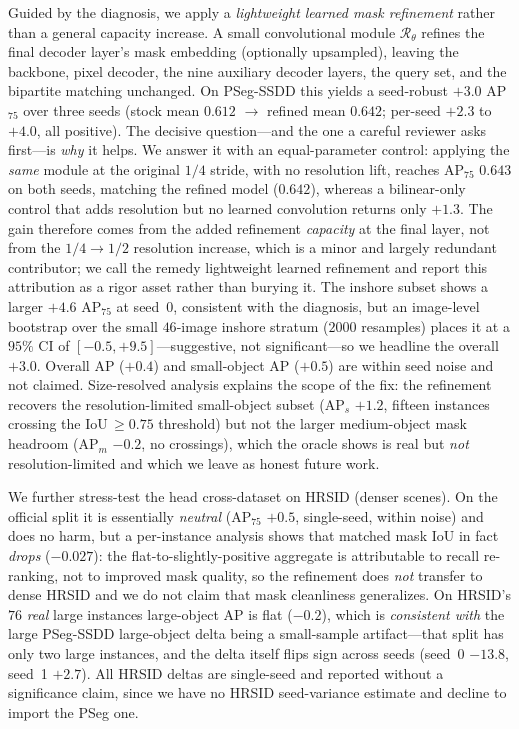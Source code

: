 Guided by the diagnosis, we apply a \emph{lightweight learned mask refinement} rather than a general capacity increase. A small convolutional module $\mathcal{R}_{\theta}$ refines the final decoder layer's mask embedding (optionally upsampled), leaving the backbone, pixel decoder, the nine auxiliary decoder layers, the query set, and the bipartite matching unchanged. On PSeg-SSDD this yields a seed-robust $+3.0$ AP$_{75}$ over three seeds (stock mean $0.612$ $\rightarrow$ refined mean $0.642$; per-seed $+2.3$ to $+4.0$, all positive). The decisive question---and the one a careful reviewer asks first---is \emph{why} it helps. We answer it with an equal-parameter control: applying the \emph{same} module at the original $1/4$ stride, with no resolution lift, reaches AP$_{75}$ $0.643$ on both seeds, matching the refined model ($0.642$), whereas a bilinear-only control that adds resolution but no learned convolution returns only $+1.3$. The gain therefore comes from the added refinement \emph{capacity} at the final layer, not from the $1/4\!\rightarrow\!1/2$ resolution increase, which is a minor and largely redundant contributor; we call the remedy lightweight learned refinement and report this attribution as a rigor asset rather than burying it. The inshore subset shows a larger $+4.6$ AP$_{75}$ at seed~0, consistent with the diagnosis, but an image-level bootstrap over the small $46$-image inshore stratum ($2000$ resamples) places it at a $95\%$ CI of $[-0.5,+9.5]$---suggestive, not significant---so we headline the overall $+3.0$. Overall AP ($+0.4$) and small-object AP ($+0.5$) are within seed noise and not claimed. Size-resolved analysis explains the scope of the fix: the refinement recovers the resolution-limited small-object subset (AP$_s$ $+1.2$, fifteen instances crossing the IoU$\,\ge\!0.75$ threshold) but not the larger medium-object mask headroom (AP$_m$ $-0.2$, no crossings), which the oracle shows is real but \emph{not} resolution-limited and which we leave as honest future work.

We further stress-test the head cross-dataset on HRSID (denser scenes). On the official split it is essentially \emph{neutral} (AP$_{75}$ $+0.5$, single-seed, within noise) and does no harm, but a per-instance analysis shows that matched mask IoU in fact \emph{drops} ($-0.027$): the flat-to-slightly-positive aggregate is attributable to recall re-ranking, not to improved mask quality, so the refinement does \emph{not} transfer to dense HRSID and we do not claim that mask cleanliness generalizes. On HRSID's $76$ \emph{real} large instances large-object AP is flat ($-0.2$), which is \emph{consistent with} the large PSeg-SSDD large-object delta being a small-sample artifact---that split has only two large instances, and the delta itself flips sign across seeds (seed~0 $-13.8$, seed~1 $+2.7$). All HRSID deltas are single-seed and reported without a significance claim, since we have no HRSID seed-variance estimate and decline to import the PSeg one.

